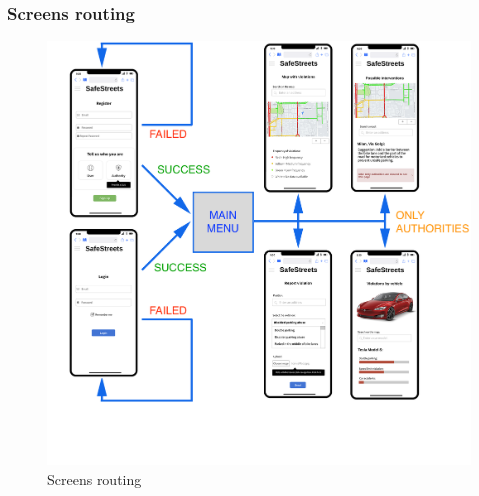 \newpage

\subsubsection{Screens routing}

\begin{figure}[H]
	\centering
	\includegraphics[width=1.1\linewidth]{Images/screen-diagram.png}
	\caption{Screens routing}
	\label{fig:Screens routing}
\end{figure}




